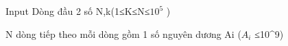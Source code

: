 Input
Dòng đầu 2 số N,k(1≤K≤N≤$10^{5}$   )  

   N dòng tiếp theo mỗi dòng gồm 1 số nguyên dương Ai ($A_{i}$   ≤10^9)